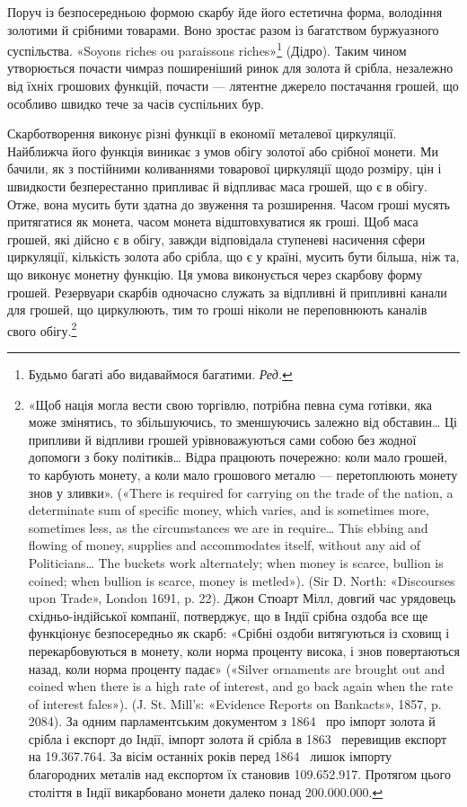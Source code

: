 Поруч із безпосередньою формою скарбу йде його естетична
форма, володіння золотими й срібними товарами. Воно зростає
разом із багатством буржуазного суспільства. «Soyons riches
ou paraissons riches»\footnote*{
Будьмо багаті або видаваймося багатими. \emph{Ред.}
} (Дідро). Таким чином утворюється почасти
чимраз поширеніший ринок для золота й срібла, незалежно від
їхніх грошових функцій, почасти — лятентне джерело постачання
грошей, що особливо швидко тече за часів суспільних бур.

Скарботворення виконує різні функції в економії металевої
циркуляції. Найближча його функція виникає з умов обігу золотої\parbreak{}
або срібної монети. Ми бачили, як з постійними коливаннями
товарової циркуляції щодо розміру, цін і швидкости безперестанно
припливає й відпливає маса грошей, що є в обігу. Отже, вона
мусить бути здатна до звуження та розширення. Часом гроші
мусять притягатися як монета, часом монета відштовхуватися
як гроші. Щоб маса грошей, які дійсно є в обігу, завжди відповідала
ступеневі насичення сфери циркуляції, кількість золота
або срібла, що є у країні, мусить бути більша, ніж та, що виконує
монетну функцію. Ця умова виконується через скарбову
форму грошей. Резервуари скарбів одночасно служать за відпливні
й припливні канали для грошей, що циркулюють, тим то
гроші ніколи не переповнюють каналів свого обігу.\footnote{«Щоб нація могла вести свою торгівлю, потрібна певна сума
готівки, яка може змінятись, то збільшуючись, то зменшуючись залежно
від обставин\dots{} Ці припливи й відпливи грошей урівноважуються
сами собою без жодної допомоги з боку політиків\dots{} Відра працюють почережно:
коли мало грошей, то карбують монету, а коли мало грошового
металю — перетоплюють монету знов у зливки». («There is required for
carrying on the trade of the nation, a determinate sum of specific money,
which varies, and is sometimes more, sometimes less, as the circumstances
we are in require\dots{} This ebbing and flowing of money, supplies and accommodates
itself, without any aid of Politicians\dots{} The buckets work alternately;
when money is scarce, bullion is coined; when bullion is scarce, money
is metled»). (Sir D. North: «Discourses upon Trade», London 1691, p. 22).
Джон Стюарт Мілл, довгий час урядовець східньо-індійської компанії,
потверджує, що в Індії срібна оздоба все ще функціонує безпосередньо як
скарб: «Срібні оздоби витягуються із сховищ і перекарбовуються в монету,
коли норма проценту висока, і знов повертаються назад, коли норма проценту
падає» («Silver ornaments are brought out and coined when there
is a high rate of interest, and go back again when the rate of interest fales»).
(J. St. Mill’s: «Evidence Reports on Bankacts», 1857, p. 2084). За одним
парламентським документом з 1864~ про імпорт золота й срібла і експорт
до Індії, імпорт золота й срібла в 1863~ перевищив експорт на \num{19.367.764}. За вісім останніх років перед 1864~ лишок імпорту
благородних металів над експортом їх становив \num{109.652.917}.
Протягом цього століття в Індії викарбовано монети далеко понад
\num{200.000.000}.}


